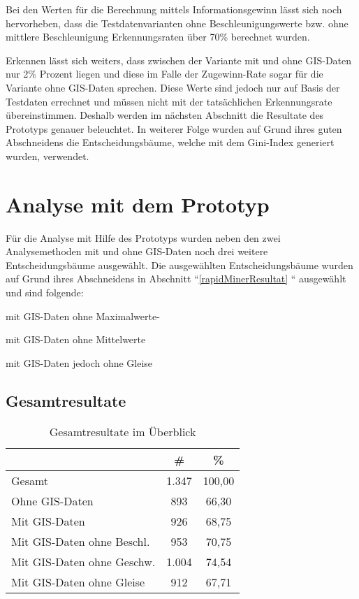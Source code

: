 Bei den Werten für die Berechnung mittels Informationsgewinn lässt sich noch hervorheben, dass die Testdatenvarianten ohne Beschleunigungswerte bzw. ohne mittlere Beschleunigung Erkennungsraten über 70\% berechnet wurden. 

Erkennen lässt sich weiters, dass zwischen der Variante mit und ohne GIS-Daten nur 2\% Prozent liegen und diese im Falle der Zugewinn-Rate sogar für die Variante ohne GIS-Daten sprechen. Diese Werte sind jedoch nur auf Basis der Testdaten errechnet und müssen nicht mit der tatsächlichen Erkennungsrate übereinstimmen. Deshalb werden im nächsten Abschnitt die Resultate des Prototyps genauer beleuchtet. In weiterer Folge wurden auf Grund ihres guten Abschneidens die Entscheidungsbäume, welche mit dem Gini-Index generiert wurden, verwendet.

\section{Analyse mit dem Prototyp}
Für die Analyse mit Hilfe des Prototyps wurden neben den zwei Analysemethoden mit und ohne GIS-Daten noch drei weitere Entscheidungsbäume ausgewählt. Die ausgewählten Entscheidungsbäume wurden auf Grund ihres Abschneidens in Abschnitt ``\ref{rapidMinerResultat} `` ausgewählt und sind folgende:
\begin{pitemize}
\item mit GIS-Daten ohne Maximalwerte-
\item mit GIS-Daten ohne Mittelwerte
\item mit GIS-Daten jedoch ohne Gleise
\end{pitemize}

\subsection{Gesamtresultate}

\begin{table}[h]
\centering
\begin{tabular}{|l|c|c|}
\hline
 & \# & \% \\ \hline
Gesamt & 1.347 & 100,00 \\ \hline
Ohne GIS-Daten & 893 & 66,30 \\ \hline
Mit GIS-Daten & 926 & 68,75 \\ \hline
Mit GIS-Daten ohne Beschl. & 953 & 70,75 \\ \hline
Mit GIS-Daten ohne Geschw. & 1.004 & 74,54 \\ \hline
Mit GIS-Daten ohne Gleise & 912 & 67,71 \\ \hline
\end{tabular}
\caption{Gesamtresultate im Überblick}
\label{my-label}
\end{table}

